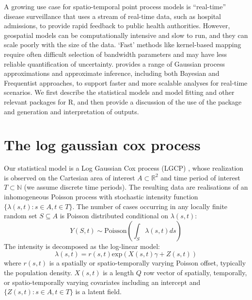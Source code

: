 A growing use case for spatio-temporal point process models is ``real-time'' disease surveillance that uses a stream of real-time data, such as hospital admissions, to provide rapid feedback to public health authorities. However, geospatial models can be computationally intensive and slow to run, and they can scale poorly with the size of the data. `Fast' methods like kernel-based mapping require often difficult selection of bandwidth parameters and may have less reliable quantification of uncertainty.  provides a range of Gaussian process approximations and approximate inference, including both Bayesian and Frequentist approaches, to support faster and more scalable analyses for real-time scenarios. We first describe the statistical models and model fitting and other relevant packages for R, and then provide a discussion of the use of the package and generation and interpretation of outputs.

\section{The log gaussian cox process}
Our statistical model is a Log Gaussian Cox process (LGCP) \citep{Diggle2013}, whose realization is observed on the Cartesian area of interest $A \subset \mathbb{R}^2$ and time period of interest $T \subset \mathbb{N}$ (we assume discrete time periods). The resulting data are realisations of an inhomogeneous Poisson process with stochastic intensity function $\{\lambda(s,t):s\in A, t\in T\}$. The number of cases occurring in any locally finite random set $S \subseteq A$ is Poisson distributed conditional on $\lambda(s,t)$:
\begin{equation}
Y(S,t) \sim \text{Poisson} \left( \int_S \lambda(s,t)ds \right)
\end{equation}
The intensity is decomposed as the log-linear model:
\begin{equation}
\lambda(s,t) = r(s,t)\text{exp}(X(s,t)\gamma + Z(s,t))
\end{equation}
where $r(s,t)$ is a spatially or spatio-temporally varying Poisson offset, typically the population density. $X(s,t)$ is a length $Q$ row vector of spatially, temporally, or spatio-temporally varying covariates including an intercept and $\{ Z(s,t): s\in A, t\in T \}$ is a latent field. 


